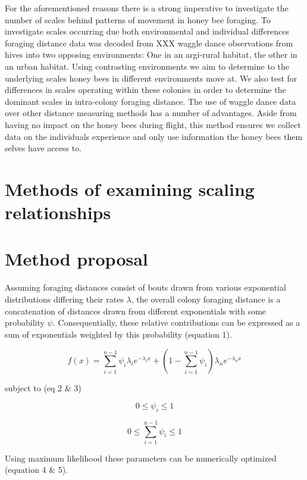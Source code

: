 \documentclass[11pt,usenames,dvipsnames]{article}
\begin{document}
For the aforementioned reasons there is a strong imperative to investigate the number of scales behind patterns of movement in honey bee foraging. To investigate scales occurring due both environmental and individual differences foraging distance data was decoded from XXX waggle dance observations from hives into two opposing environments: One in an argi-rural habitat, the other in an urban habitat. Using contrasting environments we aim to determine to the underlying scales honey bees in different environments move at. We also test for differences in scales operating within these colonies in order to determine the dominant scales in intra-colony foraging distance. The use of waggle dance data over other distance measuring methods has a number of advantages. Aside from having no impact on the honey bees during flight, this method ensures we collect data on the individuals experience and only use information the honey bees them selves have access to. 


\section{Methods of examining scaling relationships}


\section{Method proposal}
Assuming foraging distances consist of bouts drawn from various exponential distributions differing their rates $\lambda$, the overall colony foraging distance is a concatenation of distances drawn from different exponentials with some probability $\psi$. Consequentially, these relative contributions can be expressed as a sum of exponentials weighted by this probability (equation 1).  

\begin{equation}
f(x) = \sum_{i=1}^{n-1} \psi_i \lambda_i e^{-\lambda_i x} + (1 - \sum_{i=1}^{n-1}\psi_i) \lambda_n e^{-\lambda_n x}
\end{equation}

subject to (eq 2 \& 3)

\begin{equation}
0\leq \psi_i \leq 1
\end{equation}

\begin{equation}
0\leq \sum_{i=1}^{n-1}\psi_i \leq 1
\end{equation}

Using maximum likelihood these parameters can be numerically optimized (equation 4 \& 5).
\end{document}
